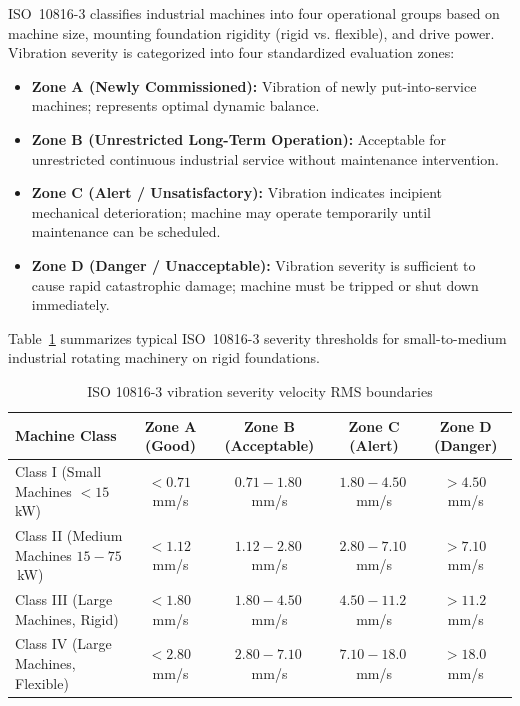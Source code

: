 ISO~10816-3 classifies industrial machines into four operational groups based on machine size, mounting foundation rigidity (rigid vs. flexible), and drive power. Vibration severity is categorized into four standardized evaluation zones:
\begin{itemize}
    \item \textbf{Zone A (Newly Commissioned):} Vibration of newly put-into-service machines; represents optimal dynamic balance.
    \item \textbf{Zone B (Unrestricted Long-Term Operation):} Acceptable for unrestricted continuous industrial service without maintenance intervention.
    \item \textbf{Zone C (Alert / Unsatisfactory):} Vibration indicates incipient mechanical deterioration; machine may operate temporarily until maintenance can be scheduled.
    \item \textbf{Zone D (Danger / Unacceptable):} Vibration severity is sufficient to cause rapid catastrophic damage; machine must be tripped or shut down immediately.
\end{itemize}
Table~\ref{tab:iso10816} summarizes typical ISO~10816-3 severity thresholds for small-to-medium industrial rotating machinery on rigid foundations.

\begin{table}[H]
\centering
\begin{tabular}{|l|c|c|c|c|}
\hline
\textbf{Machine Class} & \textbf{Zone A (Good)} & \textbf{Zone B (Acceptable)} & \textbf{Zone C (Alert)} & \textbf{Zone D (Danger)} \\
\hline
Class I (Small Machines $<15$\,kW) & $<0.71$\,mm/s & $0.71 - 1.80$\,mm/s & $1.80 - 4.50$\,mm/s & $>4.50$\,mm/s \\
Class II (Medium Machines $15-75$\,kW) & $<1.12$\,mm/s & $1.12 - 2.80$\,mm/s & $2.80 - 7.10$\,mm/s & $>7.10$\,mm/s \\
Class III (Large Machines, Rigid) & $<1.80$\,mm/s & $1.80 - 4.50$\,mm/s & $4.50 - 11.2$\,mm/s & $>11.2$\,mm/s \\
Class IV (Large Machines, Flexible) & $<2.80$\,mm/s & $2.80 - 7.10$\,mm/s & $7.10 - 18.0$\,mm/s & $>18.0$\,mm/s \\
\hline
\end{tabular}
\caption{ISO 10816-3 vibration severity velocity RMS boundaries}
\label{tab:iso10816}
\end{table}

